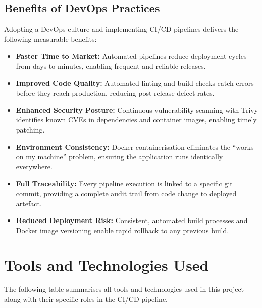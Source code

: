 \documentclass[12pt,a4paper,oneside]{report}
\begin{document}
\section{Benefits of DevOps Practices}

Adopting a DevOps culture and implementing CI/CD pipelines delivers the following
measurable benefits:

\begin{itemize}
  \item \textbf{Faster Time to Market:} Automated pipelines reduce deployment cycles
        from days to minutes, enabling frequent and reliable releases.
  \item \textbf{Improved Code Quality:} Automated linting and build checks catch
        errors before they reach production, reducing post-release defect rates.
  \item \textbf{Enhanced Security Posture:} Continuous vulnerability scanning with
        Trivy identifies known CVEs in dependencies and container images, enabling
        timely patching.
  \item \textbf{Environment Consistency:} Docker containerisation eliminates the
        ``works on my machine'' problem, ensuring the application runs identically
        everywhere.
  \item \textbf{Full Traceability:} Every pipeline execution is linked to a specific
        git commit, providing a complete audit trail from code change to deployed
        artefact.
  \item \textbf{Reduced Deployment Risk:} Consistent, automated build processes and
        Docker image versioning enable rapid rollback to any previous build.
\end{itemize}

\chapter{Tools and Technologies Used}

The following table summarises all tools and technologies used in this project along
with their specific roles in the CI/CD pipeline.
\end{document}
